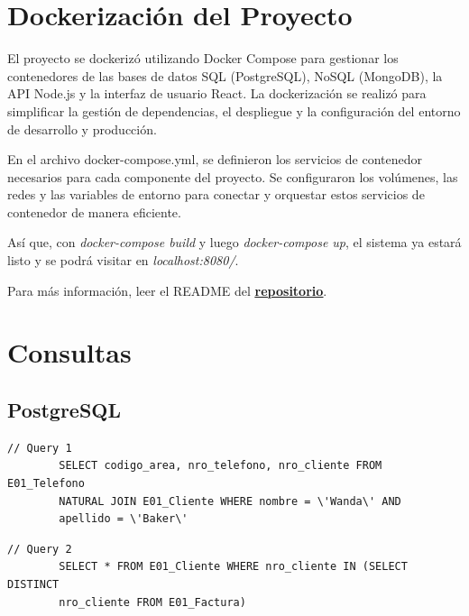 \documentclass[a4paper,12pt]{article}
\begin{document}
	
	\newpage
	
	\section{Dockerización del Proyecto}
	
	El proyecto se dockerizó utilizando Docker Compose para gestionar los contenedores de las bases de datos SQL (PostgreSQL), NoSQL (MongoDB), la API Node.js y la interfaz de usuario React. La dockerización se realizó para simplificar la gestión de dependencias, el despliegue y la configuración del entorno de desarrollo y producción.
	
	\bigskip
	
	En el archivo docker-compose.yml, se definieron los servicios de contenedor necesarios para cada componente del proyecto. Se configuraron los volúmenes, las redes y las variables de entorno para conectar y orquestar estos servicios de contenedor de manera eficiente.
	
	\bigskip
	
	Así que, con \textit{docker-compose build} y luego \textit{docker-compose up}, el sistema ya estará listo y se podrá visitar en \textit{localhost:8080/}. 
	
	\bigskip
		
	Para más información, leer el README del \href{https://github.com/TomyMarengo/bd2-tpo}{\underline{{\textbf{repositorio}}}}.
	
	\newpage
	
	\section{Consultas}
	
	\subsection{PostgreSQL}
	
	\begin{lstlisting}[frame=single, tabsize=1]
		// Query 1
		SELECT codigo_area, nro_telefono, nro_cliente FROM E01_Telefono 
		NATURAL JOIN E01_Cliente WHERE nombre = \'Wanda\' AND 
		apellido = \'Baker\'
	\end{lstlisting}

	\bigskip

	\begin{lstlisting}[frame=single, tabsize=1]
		// Query 2
		SELECT * FROM E01_Cliente WHERE nro_cliente IN (SELECT DISTINCT
		nro_cliente FROM E01_Factura)
	\end{lstlisting}
\end{document}
